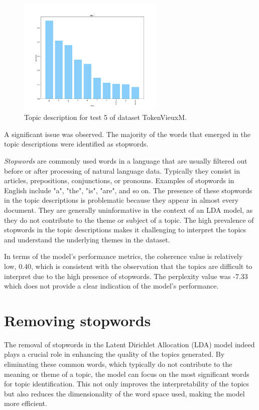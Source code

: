 \documentclass[10pt]{article} %
\begin{document}
\begin{figure}[H]
		\includegraphics[width=7cm]{images/plots/test_5/topic_7.png}

	\caption{Topic description for test 5 of dataset TokenVieuxM.}
\end{figure}

	A significant issue was observed. The majority of the words that emerged in the topic descriptions were identified as stopwords. 

	\textit{Stopwords} are commonly used words in a language that are usually filtered out before or after processing of natural language data. Typically they consist in articles, prepositions, conjunctions, or pronouns. Examples of stopwords in English include "a", "the", "is", "are", and so on. The presence of these stopwords in the topic descriptions is problematic because they appear in almost every document. They are generally uninformative in the context of an LDA model, as they do not contribute to the theme or subject of a topic. The high prevalence of stopwords in the topic descriptions makes it challenging to interpret the topics and understand the underlying themes in the dataset.
	
	In terms of the model's performance metrics, the coherence value is relatively low, 0.40, which is consistent with the observation that the topics are difficult to interpret due to the high presence of stopwords. The perplexity value was -7.33 which does not provide a clear indication of the model's performance. 
	
	\section{Removing stopwords}
	
	The removal of stopwords in the Latent Dirichlet Allocation (LDA) model indeed plays a crucial role in enhancing the quality of the topics generated. By eliminating these common words, which typically do not contribute to the meaning or theme of a topic, the model can focus on the most significant words for topic identification. This not only improves the interpretability of the topics but also reduces the dimensionality of the word space used, making the model more efficient.
	
\end{document}
